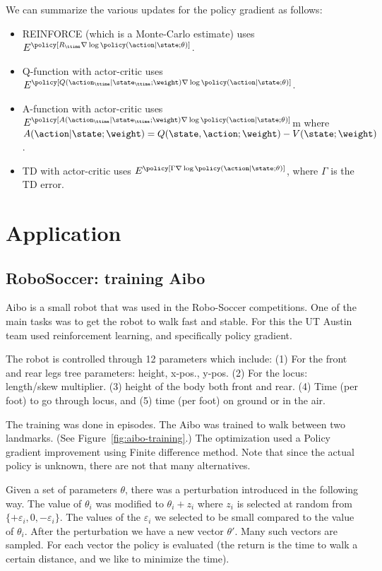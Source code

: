 We can summarize the various updates for the policy gradient as
follows:
\begin{itemize}
\item REINFORCE (which is a Monte-Carlo estimate) uses
$E^\policy[R_\ttime \nabla\log\policy(\action|\state;\theta) ]$.
\item Q-function with actor-critic uses
$E^\policy[Q(\action_\ttime|\state_\ttime;\weight)
\nabla\log\policy(\action|\state;\theta) ]$.
\item A-function with actor-critic uses
$E^\policy[A(\action_\ttime|\state_\ttime;\weight)
\nabla\log\policy(\action|\state;\theta) ]$m where
$A(\action|\state;\weight)=Q(\state,\action;\weight)-V(\state;\weight)$.
\item TD with actor-critic uses
$E^\policy[\Gamma\nabla\log\policy(\action|\state;\theta) ]$, where
$\Gamma$ is the TD error.
\end{itemize}

\section{Application}

\subsection{RoboSoccer: training Aibo}

Aibo is a small robot that was used in the Robo-Soccer competitions.
One of the main tasks was to get the robot to walk fast and stable.
For this the UT Austin team used reinforcement learning, and
specifically policy gradient.

The robot is controlled through 12 parameters which include: (1) For
the front and rear legs tree parameters: height, x-pos., y-pos. (2)
For the locus:  length/skew multiplier. (3) height of the body both
front and rear. (4) Time (per foot) to go through locus, and (5)
time (per foot) on ground or in the air.

The training was done in episodes. The Aibo was trained to walk
between two landmarks. (See Figure~\ref{fig:aibo-training}.) The
optimization used a Policy gradient improvement using Finite
difference method. Note that since the actual policy is unknown,
there are not that many alternatives.

Given a set of parameters $\theta$, there was a perturbation
introduced in the following way. The value of $\theta_i$ was
modified to $\theta_i+z_i$ where $z_i$ is selected at random from
$\{+\varepsilon_i,0,-\varepsilon_i\}$. The values of the
$\varepsilon_i$ we selected to be small compared to the value of
$\theta_i$. After the perturbation we have a new vector $\theta'$.
Many such vectors are sampled. For each vector the policy is
evaluated (the return is the time to walk a certain distance, and we
like to minimize the time).

